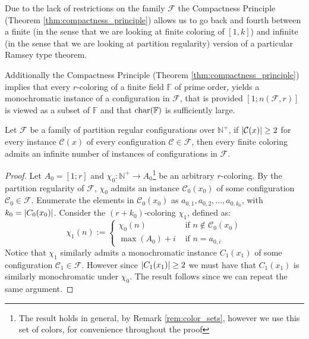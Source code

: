 Due to the lack of restrictions on the family $\mathcal{F}$ the Compactness Principle (Theorem \ref{thm:compactness_principle}) allows us to go back and fourth between a finite (in the sense that we are looking at finite coloring of $[1, k]$) and infinite (in the sense that we are looking at partition regularity) version of a particular Ramsey type theorem.

Additionally the Compactness Principle (Theorem \ref{thm:compactness_principle}) implies that every $r$-coloring of a finite field $\mathbb{F}$ of prime order, yields a monochromatic instance of a configuration in $\mathcal{F}$, that is provided $[1; n(\mathcal{F}, r)]$ is viewed as a subset of $\mathbb{F}$ and that $\textnormal{char}(\mathbb{F})$ is sufficiently large.

\begin{theorem}
	Let $\mathcal{F}$ be a family of partition regular configurations over $\mathbb{N}^{+}$, if $\left\lvert\mathcal{C}(x)\right\rvert \geq 2$ for every instance $\mathcal{C}(x)$ of every configuration $\mathcal{C} \in \mathcal{F}$, then every finite coloring admits an infinite number of instances of configurations in $\mathcal{F}$.
\end{theorem}
\begin{proof} Let $A_{0} = [1; r]$ and $\chi_{0}: \mathbb{N}^+ \to A_{0}$\footnote{The result holds in general, by Remark \ref{rem:color_sets}, however we use this set of colors, for convenience throughout the proof} be an arbitrary $r$-coloring. By the partition regularity of $\mathcal{F}$, $\chi_{0}$ admits an instance $\mathcal{C}_{0}(x_{0})$ of some configuration $\mathcal{C}_{0} \in \mathcal{F}$. Enumerate the elements in $\mathcal{C}_{0}(x_{0})$ as $a_{0,1}, a_{0,2}, \ldots, a_{0, k_{0}}$, with $k_0 = \left\lvert C_{0}(x_{0})\right\rvert$. Consider the $(r + k_{0})$-coloring $\chi_{1}$, defined as:
	\begin{equation*}
		\chi_1(n) := \begin{cases} \chi_{0}(n)   & \text{ if } n \not \in \mathcal{C}_{0}(x_{0}) \\
              \max(A_0) + i & \text{ if }  n = a_{0, i}
		\end{cases}
	\end{equation*}
	Notice that $\chi_1$ similarly admits a monochromatic instance $C_1(x_1)$ of some configuration $\mathcal{C}_1 \in \mathcal{F}$. However since $\left\lvert C_1(x_1)\right\rvert \geq 2$ we must have that $C_1(x_1)$ is similarly monochromatic under $\chi_0$. The result follows since we can repeat the same argument.
\end{proof}





